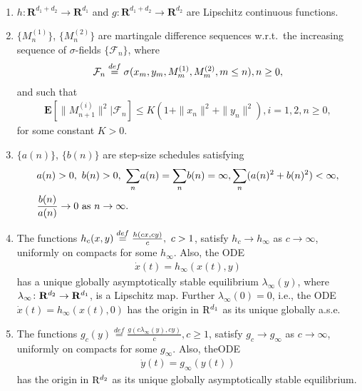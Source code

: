 \begin{assumption}\label{lip}
\mbox{ }\\
\begin{enumerate}
\item $h\colon\mathbf{R}^{d_1+d_2} \rightarrow \mathbf{R}^{d_1}$ and $g\colon\mathbf{R}^{d_1+d_2} 
\rightarrow \mathbf{R}^{d_2}$ are Lipschitz continuous functions.
\item $\{M^{(1)}_n\}$, $\{M^{(2)}_n\}$ are martingale difference sequences w.r.t.~the increasing sequence 
of $\sigma$-fields $\{\mathcal{F}_n\}$, where
\begin{align}
\mathcal{F}_n\stackrel{def}{=} \sigma(x_m,y_m,M^{(1)}_m,M^{(2)}_m,m\leq n), n \geq 0,\nonumber
\end{align}
and such that
\begin{align}
\mathbf{E}[\parallel M^{(i)}_{n+1}\parallel^2|\mathcal{F}_n]\leq K(1+\parallel x_n\parallel^2+
\parallel y_n\parallel^2), i=1, 2, n\geq 0,
\end{align}
for some constant $K>0$.
\item  $\{a(n)\}$, $\{b(n)\} $ are step-size schedules satisfying
\begin{align}
&a(n) > 0,\mbox{ } b(n) >0,\mbox{ } \underset{n}{\sum} a(n) = \underset{n}{\sum} b(n) =\infty, \underset{n}{\sum}(a(n)^2+b(n)^2) < \infty,\nonumber\\ &\frac{b(n)}{a(n)} \rightarrow 0 \mbox{ } \text{as}\mbox{ } n \rightarrow \infty.
\end{align}
\item \label{scalex} The functions $h_c(x,y)\stackrel{def}{=}\frac{h(cx,cy)}{c} ,\mbox{ } c>1$, satisfy $h_c \rightarrow h_\infty$ as $c \rightarrow \infty$, uniformly on compacts for some $h_\infty$. Also, the ODE
\begin{align}\label{odefastinf}
\dot{x}(t)=h_\infty(x(t),y)
\end{align}
has a unique globally asymptotically stable equilibrium $\lambda_\infty(y)$, where $\lambda_\infty \colon \mathbf{R}^{d_2} \rightarrow \mathbf{R}^{d_1}$, is a Lipschitz map. Further $\lambda_\infty(0)=0$, i.e., the ODE $\dot{x}(t)=h_\infty(x(t),0)$ has the origin in $\mathrm{R}^{d_1}$ as its unique globally a.s.e.
\item  \label{scaley}  The functions $g_c(y) \stackrel{def}{=}\frac{g(c\lambda_\infty(y),cy)}{c}, c\geq 1$, satisfy $g_c \rightarrow g_\infty$ as $c \rightarrow \infty$, uniformly on compacts for some $g_\infty$. Also, theODE
\begin{align}\label{odeslowinf}
\dot{y}(t)=g_\infty(y(t))
\end{align}
has the origin in $\mathrm{R}^{d_2}$ as its unique globally asymptotically stable equilibrium.
\end{enumerate}
\end{assumption}

